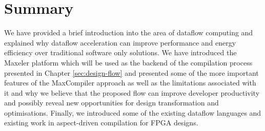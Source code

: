 \section{Summary}

We have provided a brief introduction into the area of dataflow
computing and explained why dataflow acceleration can improve
performance and energy efficiency over traditional software only
solutions. We have introduced the Maxeler platform which will be used
as the backend of the compilation process presented in Chapter
\ref{sec:design-flow} and presented some of the more important
features of the MaxCompiler approach as well as the limitations
associated with it and why we believe that the proposed flow can
improve developer productivity and possibly reveal new opportunities
for design transformation and optimisations. Finally, we introduced
some of the existing dataflow languages and existing work in
aspect-driven compilation for FPGA designs.
